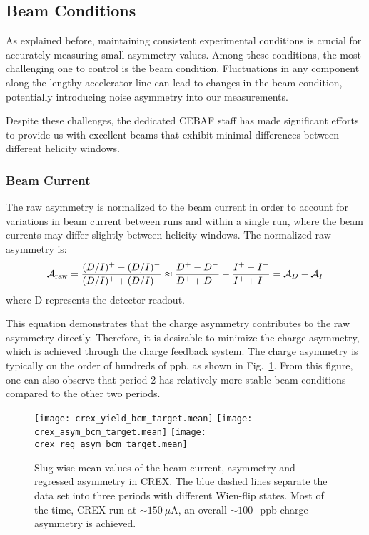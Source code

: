 \subsection{Beam Conditions}
As explained before, maintaining consistent experimental conditions is crucial for accurately measuring small asymmetry values. Among these conditions, the most challenging one to control is the beam condition. Fluctuations in any component along the lengthy accelerator line can lead to changes in the beam condition, potentially introducing noise asymmetry into our measurements.

Despite these challenges, the dedicated CEBAF staff has made significant efforts to provide us with excellent beams that exhibit minimal differences between different helicity windows.

\subsubsection{Beam Current}
The raw asymmetry is normalized to the beam current in order to account for variations in beam current between runs and within a single run, where the beam currents may differ slightly between helicity windows. The normalized raw asymmetry is:
\begin{equation}
    \mathcal{A}_{\text{raw}} = \frac{(D/I)^+ - (D/I)^-}{(D/I)^+ + (D/I)^-}
	\approx \frac{D^+ - D^-}{D^+ + D^-} - \frac{I^+ - I^-}{I^+ + I^-}
	= \mathcal{A}_D - \mathcal{A}_I
\end{equation}
where D represents the detector readout.

This equation demonstrates that the charge asymmetry contributes to the raw asymmetry directly.
Therefore, it is desirable to minimize the charge asymmetry, which is achieved 
through the charge feedback system. The charge asymmetry is typically on the order
of hundreds of ppb, as shown in Fig.~\ref{fig:crex_bcm_target}.
From this figure, one can also observe 
that period 2 has relatively more stable beam conditions compared to the other two periods.
\begin{figure}[H]
    \centering
    \texttt{[image: crex\_yield\_bcm\_target.mean]}
    \texttt{[image: crex\_asym\_bcm\_target.mean]}
    \texttt{[image: crex\_reg\_asym\_bcm\_target.mean]}
    \caption[Asymmetry slug-wise plot]
    {Slug-wise mean values of the beam current, asymmetry and regressed 
    asymmetry in CREX. The blue dashed lines separate
    the data set into three periods with different Wien-flip states.
    Most of the time, CREX run at $\sim 150\ \mu$A, an overall $\sim 100~$~ppb charge 
    asymmetry is achieved.}
    \label{fig:crex_bcm_target}
\end{figure}

